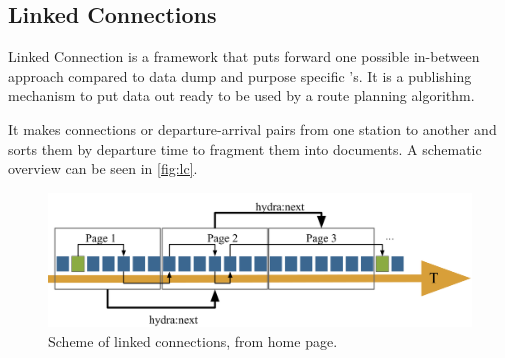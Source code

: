\subsection{Linked Connections}
Linked Connection\cite{rojas_melendez_publishing_2022, noauthor_linked_nodate} is a framework that puts forward one possible in-between approach compared to data dump and purpose specific 's. It is a publishing mechanism to put data out ready to be used by a route planning algorithm. 

It makes connections or departure-arrival pairs from one station to another and sorts them by departure time to fragment them into documents. A schematic overview can be seen in \autoref{fig:lc}.

\begin{figure}[h]
    \centering
    \includegraphics[width=\textwidth]{images/lc_scheme.png}
    \caption{Scheme of linked connections, from \cite{noauthor_linked_nodate} home page.}
    \label{fig:lc}
\end{figure}


